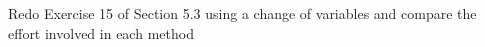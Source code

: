 Redo Exercise 15 of Section 5.3 using a change of variables and compare the effort involved in each method
